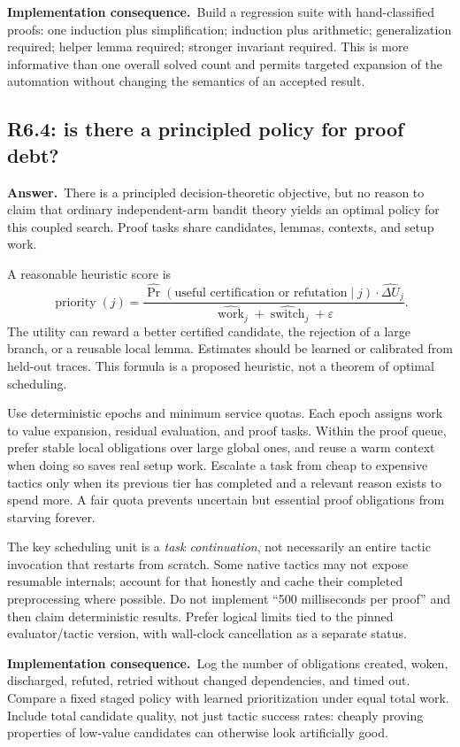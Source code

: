 \documentclass[11pt,a4paper]{article}
\theoremstyle{definition}
\theoremstyle{remark}
\newcommand{\ans}{\noindent\textbf{Answer.}\ }
\newcommand{\imp}{\par\noindent\textbf{Implementation consequence.}\ }
\begin{document}
\imp Build a regression suite with hand-classified proofs: one induction plus
simplification; induction plus arithmetic; generalization required; helper
lemma required; stronger invariant required. This is more informative than
one overall solved count and permits targeted expansion of the automation
without changing the semantics of an accepted result.

\subsection{R6.4: is there a principled policy for proof debt?}\label{q:R6.4}
\ans There is a principled decision-theoretic objective, but no reason to claim
that ordinary independent-arm bandit theory yields an optimal policy for this
coupled search. Proof tasks share candidates, lemmas, contexts, and setup work.

A reasonable heuristic score is
\[
 \operatorname{priority}(j)=
 \frac{\widehat{\Pr}(\text{useful certification or refutation}\mid j)
       \cdot\widehat{\Delta U}_j}
      {\widehat{\operatorname{work}}_j+\widehat{\operatorname{switch}}_j+\varepsilon}.
\]
The utility can reward a better certified candidate, the rejection of a large
branch, or a reusable local lemma. Estimates should be learned or calibrated
from held-out traces. This formula is a proposed heuristic, not a theorem of
optimal scheduling.

Use deterministic epochs and minimum service quotas. Each epoch assigns work
to value expansion, residual evaluation, and proof tasks. Within the proof
queue, prefer stable local obligations over large global ones, and reuse a
warm context when doing so saves real setup work. Escalate a task from cheap
to expensive tactics only when its previous tier has completed and a relevant
reason exists to spend more. A fair quota prevents uncertain but essential
proof obligations from starving forever.

The key scheduling unit is a \emph{task continuation}, not necessarily an
entire tactic invocation that restarts from scratch. Some native tactics may
not expose resumable internals; account for that honestly and cache their
completed preprocessing where possible. Do not implement ``500 milliseconds
per proof'' and then claim deterministic results. Prefer logical limits tied
to the pinned evaluator/tactic version, with wall-clock cancellation as a
separate status.

\imp Log the number of obligations created, woken, discharged, refuted,
retried without changed dependencies, and timed out. Compare a fixed staged
policy with learned prioritization under equal total work. Include total
candidate quality, not just tactic success rates: cheaply proving properties
of low-value candidates can otherwise look artificially good.
\end{document}
